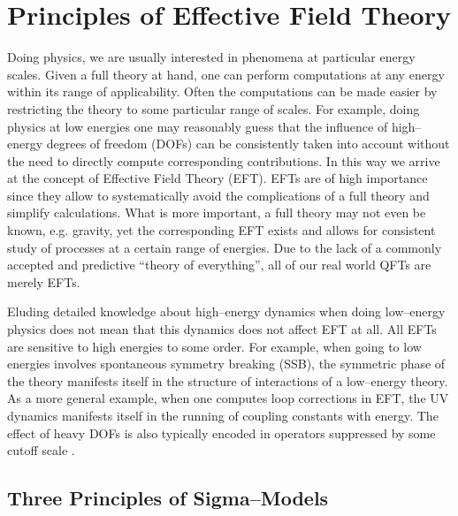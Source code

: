 \documentclass[11pt,a4paper]{article}
\begin{document}
\section{Principles of Effective Field Theory}
\label{sec:princ}

Doing physics, we are usually interested in phenomena at particular energy scales. Given a full theory at hand, one can perform computations at any energy within its range of applicability. Often the computations can be made easier by restricting the theory to some particular range of scales. For example, doing physics at low energies one may reasonably guess that the influence of high--energy degrees of freedom (DOFs) can be consistently taken into account without the need to directly compute corresponding contributions.
In this way we arrive at the concept of Effective Field Theory (EFT).
EFTs are of high importance since they allow to
systematically avoid the complications of a full theory and simplify calculations. What is more important, a full theory may not even be known, e.g. gravity, yet the corresponding EFT exists and allows for consistent study of processes at a certain range of energies.
Due to the lack of a commonly accepted and predictive ``theory of everything'', all of our real world QFTs are merely EFTs.

Eluding detailed knowledge about high--energy dynamics when doing low--energy physics does not mean that this dynamics does not affect EFT at all.
All EFTs are sensitive to high energies to some order. For example, when going to low energies involves spontaneous symmetry breaking (SSB), the symmetric phase of the theory manifests itself in the structure of interactions of a low--energy theory.
As a more general example, when one computes loop corrections in EFT,
the UV dynamics manifests itself in the running of coupling constants with energy.
The effect of heavy DOFs is also typically encoded in operators suppressed by some cutoff scale \cite{Appelquist:1974tg,Ovrut:1980eq}.

\subsection{Three Principles of Sigma--Models}
\label{sec:threesigma}
\end{document}
